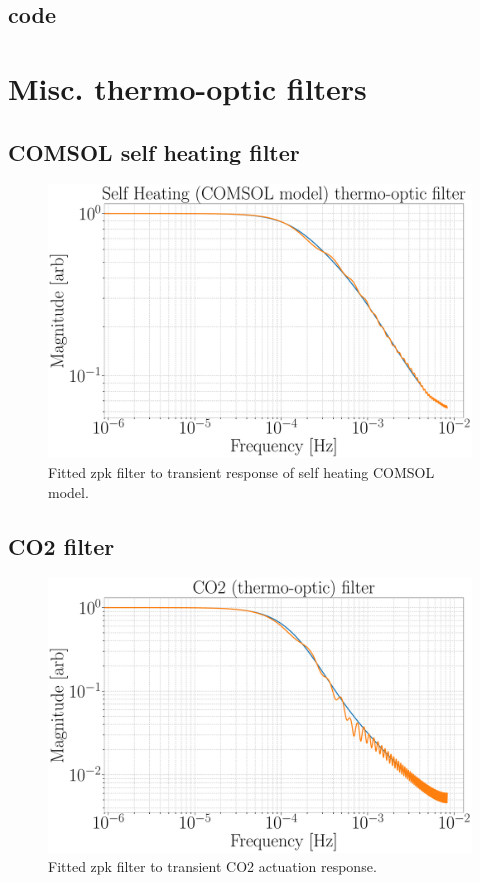 \subsection{code}


\section{Misc. thermo-optic filters}\label{sec:TO_filt}
\subsection{COMSOL self heating filter}
\begin{figure}[H]
\includegraphics[width=\textwidth]{figs/TCS/self_heating_zpk.pdf}
\caption{Fitted zpk filter to transient response of self heating COMSOL model.}
\label{fig:self_zpk_fit}
\end{figure}

\subsection{CO2 filter}
\begin{figure}[H]
\includegraphics[width=\textwidth]{figs/TCS/CO2_zpk.pdf}
\caption{Fitted zpk filter to transient CO2 actuation response.}
\label{fig:co2_zpk_fit}
\end{figure}

